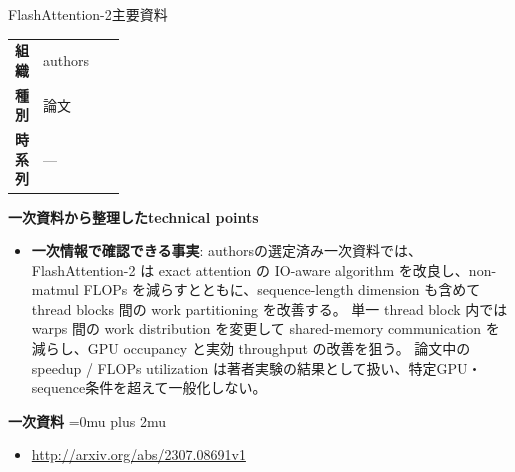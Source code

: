 \begin{technicalnote}{FlashAttention-2}{主要資料}
\begingroup
\begin{tabularx}{\linewidth}{@{}>{\bfseries}p{0.22\linewidth}X@{}}
組織 & authors \\
種別 & 論文 \\
時系列 & — \\
\end{tabularx}
\smallskip
{\bfseries 一次資料から整理したtechnical points}
\begin{itemize}[leftmargin=1.5em,itemsep=0.35em]
\item \textbf{一次情報で確認できる事実}: authorsの選定済み一次資料では、FlashAttention-2 は exact attention の IO-aware algorithm を改良し、non-matmul FLOPs を減らすとともに、sequence-length dimension も含めて thread blocks 間の work partitioning を改善する。 単一 thread block 内では warps 間の work distribution を変更して shared-memory communication を減らし、GPU occupancy と実効 throughput の改善を狙う。 論文中の speedup / FLOPs utilization は著者実験の結果として扱い、特定GPU・sequence条件を超えて一般化しない。
\end{itemize}
\begin{minipage}{\linewidth}
\begin{samepage}
{\bfseries 一次資料}
\begingroup\sloppy
\Urlmuskip=0mu plus 2mu\relax
\begin{itemize}[leftmargin=1.5em,itemsep=0.25em]
\item {\scriptsize\url{http://arxiv.org/abs/2307.08691v1}}
\end{itemize}
\endgroup
\end{samepage}
\end{minipage}
\endgroup
\end{technicalnote}
\medskip

